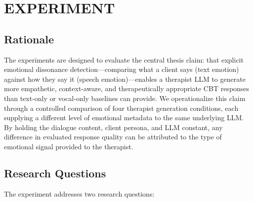 \setlength{\footskip}{8mm}

\chapter{EXPERIMENT}



\section{Rationale}

The experiments are designed to evaluate the central thesis claim: that explicit emotional dissonance detection---comparing what a client says (text emotion) against how they say it (speech emotion)---enables a therapist LLM to generate more empathetic, context-aware, and therapeutically appropriate CBT responses than text-only or vocal-only baselines can provide. We operationalize this claim through a controlled comparison of four therapist generation conditions, each supplying a different level of emotional metadata to the same underlying LLM. By holding the dialogue content, client persona, and LLM constant, any difference in evaluated response quality can be attributed to the type of emotional signal provided to the therapist.

\section{Research Questions}

The experiment addresses two research questions:


